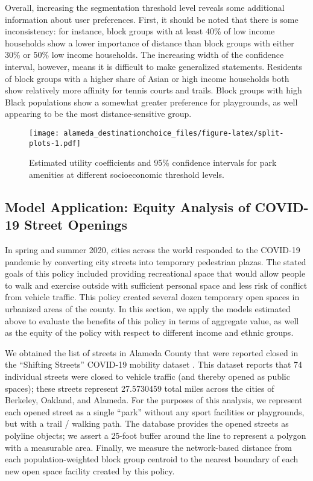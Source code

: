 \documentclass[3p, authoryear]{elsarticle} %
\makeatletter
\def\maxwidth{\ifdim\Gin@nat@width>\linewidth\linewidth
\else\Gin@nat@width\fi}
\let\Oldincludegraphics\includegraphics
\renewcommand{\includegraphics}[1]{\Oldincludegraphics[width=\maxwidth]{#1}}
\makeatother
\begin{document}
Overall, increasing the segmentation threshold level reveals some additional
information about user preferences. First, it should be noted that there is
some inconsistency: for instance, block groups with at least 40\% of low income
households show a lower importance of distance than block groups with either
30\% or 50\% low income households. The increasing width of the confidence interval,
however, means it is difficult to make generalized statements. Residents of
block groups with a higher share of Asian or high income households both show
relatively more affinity for tennis courts and trails. Block groups with high
Black populations show a somewhat greater preference for playgrounds, as well
appearing to be the most distance-sensitive group.

\begin{figure}
\centering
\texttt{[image: alameda\_destinationchoice\_files/figure-latex/split-plots-1.pdf]}
\caption{\label{fig:split-plots}Estimated utility coefficients and 95\% confidence intervals for park amenities at different socioeconomic threshold levels.}
\end{figure}

\hypertarget{model-application-equity-analysis-of-covid-19-street-openings}{%
\subsection{Model Application: Equity Analysis of COVID-19 Street Openings}\label{model-application-equity-analysis-of-covid-19-street-openings}}

In spring and summer 2020, cities across the world responded to the COVID-19
pandemic by converting city streets into temporary pedestrian plazas. The stated
goals of this policy included providing recreational space that would allow
people to walk and exercise outside with sufficient personal space and less risk
of conflict from vehicle traffic. This policy created several dozen temporary
open spaces in urbanized areas of the county. In this section, we apply the
models estimated above to evaluate the benefits of this policy in terms of
aggregate value, as well as the equity of the policy with respect to different
income and ethnic groups.

We obtained the list of streets in Alameda County that were reported closed
in the ``Shifting Streets'' COVID-19 mobility dataset \citep{slowstreets}. This dataset
reports that 74 individual streets were closed to vehicle
traffic (and thereby opened as public spaces); these streets represent
27.5730459 total miles across the cities
of Berkeley, Oakland, and Alameda. For the purposes of this analysis, we
represent each opened street as a single ``park'' without any sport facilities or
playgrounds, but with a trail / walking path. The database provides the opened
streets as polyline objects; we assert a 25-foot buffer around the line to
represent a polygon with a measurable area. Finally, we measure the network-based
distance from each population-weighted block group centroid to the nearest
boundary of each new open space facility created by this policy.
\end{document}
